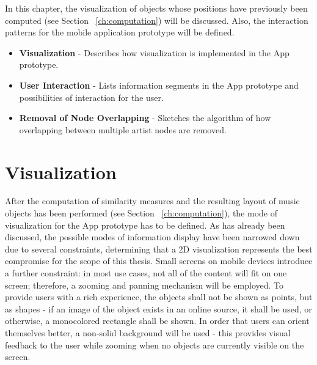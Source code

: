 In this chapter, the visualization of objects whose positions have previously been computed (see Section ~\ref{ch:computation}) will be discussed. Also, the interaction patterns for the mobile application prototype will be defined.

\begin{itemize}
	\item \textbf {Visualization} - Describes how visualization is implemented in the App prototype.
	\item \textbf {User Interaction} - Lists information segments in the App prototype and possibilities of interaction for the user.
	\item \textbf {Removal of Node Overlapping} - Sketches the algorithm of how overlapping between multiple artist nodes are removed.
\end{itemize}

\section{Visualization}

After the computation of similarity measures and the resulting layout of music objects has been performed (see Section ~\ref{ch:computation}), the mode of visualization for the App prototype has to be defined. As has already been discussed, the possible modes of information display have been narrowed down due to several constraints, determining that a 2D visualization represents the best compromise for the scope of this thesis. Small screens on mobile devices introduce a further constraint: in most use cases, not all of the content will fit on one screen; therefore, a zooming and panning mechanism will be employed. To provide users with a rich experience, the objects shall not be shown as points, but as shapes - if an image of the object exists in an online source, it shall be used, or otherwise, a monocolored rectangle shall be shown. In order that users can orient themselves better, a non-solid background will be used - this provides visual feedback to the user while zooming when no objects are currently visible on the screen.

